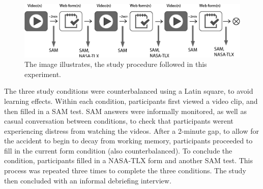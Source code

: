 \documentclass[../main/Feedback.tex]{subfiles}
\begin{document}
\begin{figure}[h]
	\centering
	\includegraphics[width=\linewidth]{../figures/study-procedure}
	\caption[study procedure]{The image illustrates, the study procedure followed in this experiment.}
	\label{fig:study-procedure}
\end{figure}


The three study conditions were counterbalanced using a Latin square, to avoid learning effects. Within each condition, participants first viewed a video clip, and then filled in a SAM test. SAM answers were informally monitored, as well as casual conversation between conditions, to check that participants werent experiencing distress from watching the videos. After a 2-minute gap, to allow for the accident to begin to decay from working memory, participants proceeded to fill in the current form condition (also counterbalanced). To conclude the condition, participants filled in a NASA-TLX form and another SAM test.
This process was repeated three times to complete the three conditions.
The study then concluded with an informal debriefing interview.
\end{document}

